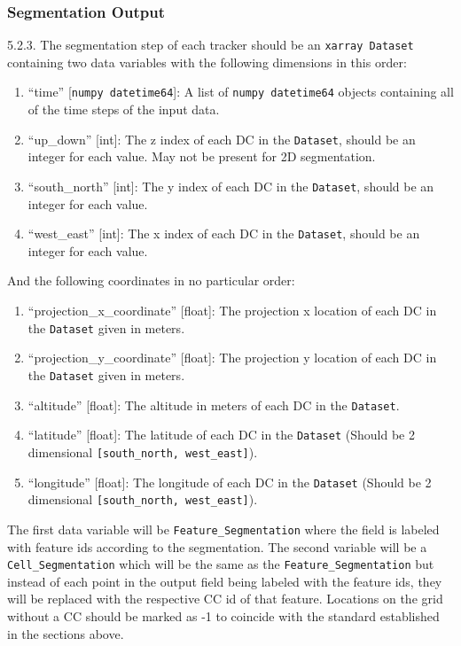 \documentclass[10pt,a4paper]{article}
\begin{document}
	\subsubsection{Segmentation Output}
	5.2.3. The segmentation step of each tracker should be an \verb|xarray Dataset| containing two data variables with the following dimensions in this order:
	\begin{enumerate}
		\item “time” [\verb|numpy datetime64|]: A list of \verb|numpy datetime64| objects containing all of the time steps of the input data.
		\item “up\_down” [int]: The z index of each \ac{DC} in the \verb|Dataset|, should be an integer for each value. May not be present for 2D segmentation. 
		\item “south\_north” [int]: The y index of each \ac{DC} in the \verb|Dataset|, should be an integer for each value.
		\item “west\_east” [int]: The x index of each \ac{DC} in the \verb|Dataset|, should be an integer for each value.
	\end{enumerate}
	And the following coordinates in no particular order:
	\begin{enumerate}
		\item “projection\_x\_coordinate” [float]: The projection x location of each \ac{DC} in the \verb|Dataset| given in meters.
		\item “projection\_y\_coordinate” [float]: The projection y location of each \ac{DC} in the \verb|Dataset| given in meters. 
		\item “altitude” [float]: The altitude in meters of each \ac{DC} in the \verb|Dataset|.
		\item “latitude” [float]: The latitude of each \ac{DC} in the \verb|Dataset| (Should be 2 dimensional \verb|[south_north, west_east]|).
		\item “longitude” [float]: The longitude of each \ac{DC} in the \verb|Dataset| (Should be 2 dimensional \verb|[south_north, west_east]|).
	\end{enumerate}
	
	The first data variable will be \verb|Feature_Segmentation| where the field is labeled with feature ids according to the segmentation. The second variable will be a \verb|Cell_Segmentation| which will be the same as the \verb|Feature_Segmentation| but instead of each point in the output field being labeled with the feature ids, they will be replaced with the respective \ac{CC} id of that feature. Locations on the grid without a \ac{CC} should be marked as -1 to coincide with the standard established in the sections above.
	
\end{document}
